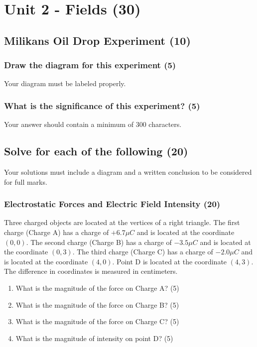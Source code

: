 \documentclass{article}
\begin{document}
\section{Unit 2 - Fields (30)}
\subsection{Milikans Oil Drop Experiment (10)}
\subsubsection{Draw the diagram for this experiment (5)}
Your diagram must be labeled properly.

\subsubsection{What is the significance of this experiment? (5)}
Your answer should contain a minimum of 300 characters.

\subsection{Solve for each of the following (20)}
Your solutions must include a diagram and a written conclusion to be considered for full marks.

\subsubsection{Electrostatic Forces and Electric Field Intensity (20)}
Three charged objects are located at the vertices of a right triangle. The first charge (Charge A) has a charge of $+6.7\mu C$ and is located at the coordinate $(0, 0)$. The second charge (Charge B) has a charge of $-3.5\mu C$ and is located at the coordinate $(0, 3)$. The third charge (Charge C) has a charge of $-2.0\mu C$ and is located at the coordinate $(4, 0)$. Point D is located at the coordinate $(4, 3)$. The difference in coordinates is measured in centimeters.
\begin{enumerate}[label=\alph*)]
    \item What is the magnitude of the force on Charge A? (5)
    \item What is the magnitude of the force on Charge B? (5)
    \item What is the magnitude of the force on Charge C? (5)
    \item What is the magnitude of intensity on point D? (5)
\end{enumerate}
\end{document}
